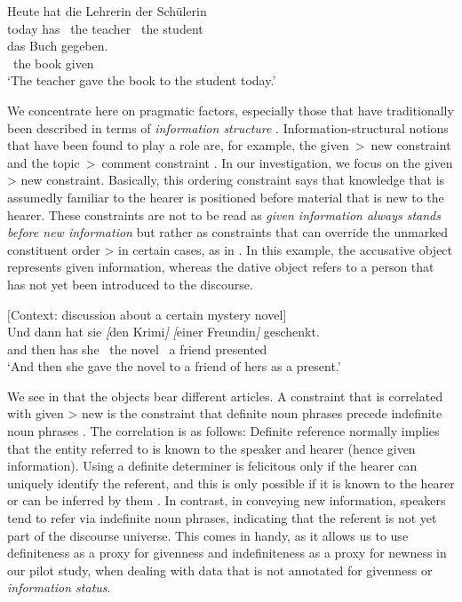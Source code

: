 \documentclass[output=paper,colorlinks,citecolor=brown]{langscibook}
\begin{document}
\ea\label{ex:animated}
    {\gll Heute hat \up{[}die Lehrerin\up{]\sub{\textsc{nom}, anim}} \up{[}der Schülerin\up{]\sub{\textsc{dat}, anim}} \\
   today has {\ the} teacher {\ the} student \\}
    \gll\up{[}das Buch\up{]\sub{\textsc{acc}, inanim}} gegeben. \\ 
    {\ the} book given \\
    \glt `The teacher gave the book to the student today.'
\z

We concentrate here on pragmatic factors, especially those that have traditionally been described in terms of \textit{information structure} \citep[][]{Fery.Krifka.2008}. Information-structural notions that have been found to play a role are, for example, the given~>~new constraint \citep[][]{lenerz77}  and the topic~>~comment constraint \citep[][]{frey04}. In our investigation, we focus on the given > new constraint. Basically, this ordering constraint says that knowledge that is assumedly familiar to the hearer is positioned before material that is new to the hearer. These constraints are not to be read as \textit{given information always stands before new information} but rather as constraints that can override the unmarked constituent order \ReichDat{} > \ReichAcc{} in certain cases, as in . In this example, the accusative object represents given information, whereas the dative object refers to a person that has not yet been introduced to the discourse. 

\ea\label{ex:Krimikontext}
$[$Context: discussion about a certain mystery novel$]$\\
   \gll	Und dann hat sie \emph{[}den Krimi\emph{]} \emph{[}einer Freundin\emph{]} geschenkt. \\ 
    and then has she {\ the} novel {\ a} friend presented \\
    \glt `And then she gave the novel to a friend of hers as a present.'
\z

We see in  that the objects bear different articles. A constraint that is correlated with given > new is the constraint that definite noun phrases precede indefinite noun phrases \citep{lenerz77,rauth20}. The correlation is as follows: Definite reference normally implies that the entity referred to is known to the speaker and hearer (hence given information). Using a definite determiner is felicitous only if the hearer can uniquely identify the referent, and this is only possible if it is known to the hearer or can be inferred by them \citep{Prince}. In contrast, in conveying new information, speakers tend to refer via indefinite noun phrases, indicating that the referent is not yet part of the discourse universe. This comes in handy, as it allows us to use definiteness as a proxy for givenness and indefiniteness as a proxy for newness in our pilot study, when dealing with data that is not annotated for givenness or \emph{information status}.
\end{document}
